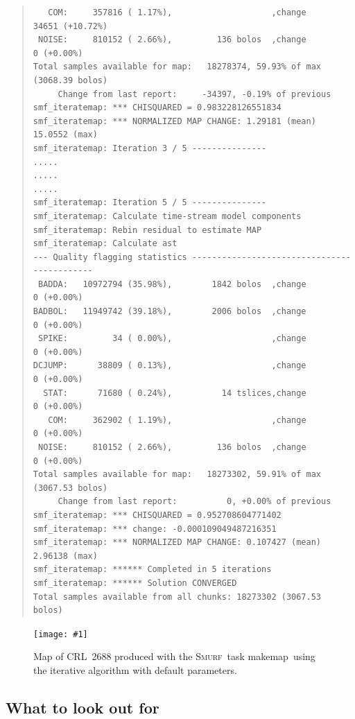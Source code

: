 \documentclass[twoside,11pt]{article}
\newcommand{\htmladdimg}[1]{}
\newcommand{\latex}[1]{#1}
\newcommand{\xref}[3]{#1}
\newcommand{\xlabel}[1]{}
\renewcommand{\_}{\texttt{\symbol{95}}}
\newenvironment{myquote}{\begin{quote}\begin{small}}{\end{small}\end{quote}}
\newcommand{\smurf}{\xref{\textsc{Smurf}}{sun258}{}}
\newcommand{\task}[1]{\textsf{#1}}
\newcommand{\makemap}{\xref{\task{makemap}}{sun258}{MAKEMAP}}
\newcommand{\myfig}[6]{
  \begin{figure}#2
    \centering\texttt{[image: \#1]}
    \typeout{#1 inserted on page \arabic{page}}
    \caption[#5]{\label{#4}\small #6}
  \end{figure}
}
\newcommand{\myfig}[6]{
    \label{#4} \htmladdimg{#1.png}\\
    \\
    Figure: #6\\
  }
\begin{document}
\begin{myquote}
\begin{verbatim}
   COM:     357816 ( 1.17%),                    ,change      34651 (+10.72%)
 NOISE:     810152 ( 2.66%),         136 bolos  ,change          0 (+0.00%)
Total samples available for map:   18278374, 59.93% of max (3068.39 bolos)
     Change from last report:     -34397, -0.19% of previous
smf_iteratemap: *** CHISQUARED = 0.983228126551834
smf_iteratemap: *** NORMALIZED MAP CHANGE: 1.29181 (mean) 15.0552 (max)
smf_iteratemap: Iteration 3 / 5 ---------------
.....
.....
.....
smf_iteratemap: Iteration 5 / 5 ---------------
smf_iteratemap: Calculate time-stream model components
smf_iteratemap: Rebin residual to estimate MAP
smf_iteratemap: Calculate ast
--- Quality flagging statistics --------------------------------------------
 BADDA:   10972794 (35.98%),        1842 bolos  ,change          0 (+0.00%)
BADBOL:   11949742 (39.18%),        2006 bolos  ,change          0 (+0.00%)
 SPIKE:         34 ( 0.00%),                    ,change          0 (+0.00%)
DCJUMP:      38809 ( 0.13%),                    ,change          0 (+0.00%)
  STAT:      71680 ( 0.24%),          14 tslices,change          0 (+0.00%)
   COM:     362902 ( 1.19%),                    ,change          0 (+0.00%)
 NOISE:     810152 ( 2.66%),         136 bolos  ,change          0 (+0.00%)
Total samples available for map:   18273302, 59.91% of max (3067.53 bolos)
     Change from last report:          0, +0.00% of previous
smf_iteratemap: *** CHISQUARED = 0.952708604771402
smf_iteratemap: *** change: -0.000109049487216351
smf_iteratemap: *** NORMALIZED MAP CHANGE: 0.107427 (mean) 2.96138 (max)
smf_iteratemap: ****** Completed in 5 iterations
smf_iteratemap: ****** Solution CONVERGED
Total samples available from all chunks: 18273302 (3067.53 bolos)
\end{verbatim}
\end{myquote}
\begin{htmlonly}
\myfig{sc21_crl2688}{[t!]}{width=0.7\linewidth}{fig:itermap}{
  CRL~2688 produced with \makemap}{
  Map of CRL~2688 produced with the \smurf\ task \makemap\ using the
  iterative algorithm with default parameters.
}
\end{htmlonly}

\subsection{\xlabel{look_for}What to look out for}
\flushbottom
\end{document}
